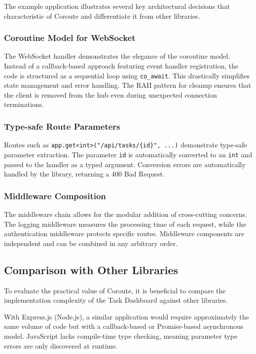 The example application illustrates several key architectural decisions that characteristic of Coroute and differentiate it from other libraries.

\subsubsection{Coroutine Model for WebSocket}

The WebSocket handler demonstrates the elegance of the coroutine model. Instead of a callback-based approach featuring event handler registration, the code is structured as a sequential loop using \texttt{co\_await}. This drastically simplifies state management and error handling. The RAII pattern for cleanup ensures that the client is removed from the hub even during unexpected connection terminations.

\subsubsection{Type-safe Route Parameters}

Routes such as \texttt{app.get<int>("/api/tasks/\{id\}", ...)} demonstrate type-safe parameter extraction. The parameter \texttt{id} is automatically converted to an \texttt{int} and passed to the handler as a typed argument. Conversion errors are automatically handled by the library, returning a 400 Bad Request.

\subsubsection{Middleware Composition}

The middleware chain allows for the modular addition of cross-cutting concerns. The logging middleware measures the processing time of each request, while the authentication middleware protects specific routes. Middleware components are independent and can be combined in any arbitrary order.

\subsection{Comparison with Other Libraries}

To evaluate the practical value of Coroute, it is beneficial to compare the implementation complexity of the Task Dashboard against other libraries.

With Express.js (Node.js), a similar application would require approximately the same volume of code but with a callback-based or Promise-based asynchronous model. JavaScript lacks compile-time type checking, meaning parameter type errors are only discovered at runtime.

